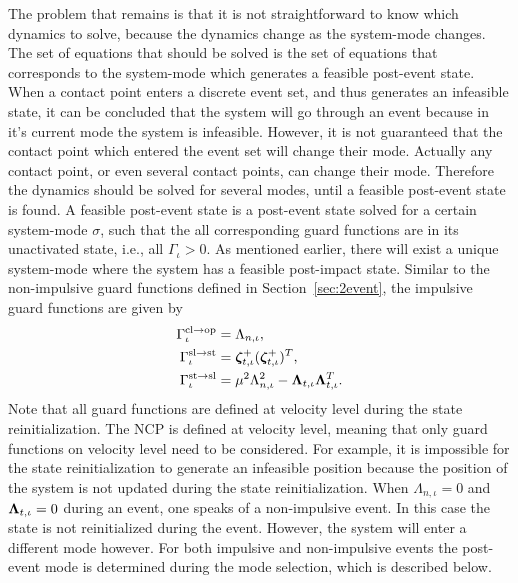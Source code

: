 \documentclass[../DC2017114Bouma.tex]{subfiles}
\begin{document}
The problem that remains is that it is not straightforward to know which dynamics to solve, because the dynamics change as the system-mode changes. The set of equations that should be solved is the set of equations that corresponds to the system-mode which generates a feasible post-event state. When a contact point enters a discrete event set, and thus generates an infeasible state, it can be concluded that the system will go through an event because in it's current mode the system is infeasible. However, it is not guaranteed that the contact point which entered the event set will change their mode. Actually any contact point, or even several contact points, can change their mode. Therefore the dynamics should be solved for several modes, until a feasible post-event state is found. A feasible post-event state is a post-event state solved for a certain system-mode $\sigma$, such that the all corresponding guard functions are in its unactivated state, i.e., all $\Gamma_{\iota}>0$. As mentioned earlier, there will exist a unique system-mode where the system has a feasible post-impact state. Similar to the non-impulsive guard functions defined in Section~\ref{sec:2event}, the impulsive guard functions are given by
\begin{align}
\Gamma^{\text{cl}\rightarrow\text{op}}_{\iota} &= \Lambda_{n,\iota},\\
\Gamma^{\text{sl}\rightarrow\text{st}}_{\iota} &= \boldsymbol{\zeta}^+_{t,\iota}(\boldsymbol{\zeta}^+_{t,\iota})^T,\\
\Gamma^{\text{st}\rightarrow\text{sl}}_{\iota} &= \mu^2\Lambda_{n,\iota}^2 - \boldsymbol{\Lambda}_{t,\iota}\boldsymbol{\Lambda}_{t,\iota}^T.
\end{align}
Note that all guard functions are defined at velocity level during the state reinitialization. The NCP is defined at velocity level, meaning that only guard functions on velocity level need to be considered. For example, it is impossible for the state reinitialization to generate an infeasible position because the position of the system is not updated during the state reinitialization. When $\Lambda_{n,\iota} = 0$ and $\boldsymbol{\Lambda}_{t,\iota} = 0$ during an event, one speaks of a non-impulsive event. In this case the state is not reinitialized during the event. However, the system will enter a different mode however. For both impulsive and non-impulsive events the post-event mode is determined during the mode selection, which is described below.
\end{document}
